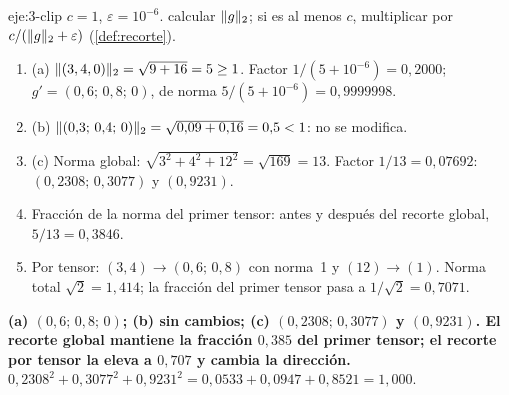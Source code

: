 \begin{solucion}{eje:3-clip}
\datos $c=1$, $\varepsilon=10^{-6}$.
\planteamiento calcular $\lVert g\rVert_2$; si es al menos $c$, multiplicar por $c/(\lVert g\rVert_2+\varepsilon)$ (\cref{def:recorte}).
\pasos
\begin{enumerate}[label=\arabic*.]
  \item (a) $\lVert(3,4,0)\rVert_2=\sqrt{9+16}=5\ge 1$. Factor $1/(5+10^{-6})=0{,}2000$; $g'=(0{,}6;\allowbreak\,0{,}8;\allowbreak\,0)$, de norma $5/(5+10^{-6})=0{,}9999998$.
  \item (b) $\lVert(0{,}3;\allowbreak\,0{,}4;\allowbreak\,0)\rVert_2=\sqrt{0{,}09+0{,}16}=0{,}5<1$: no se modifica.
  \item (c) Norma global: $\sqrt{3^{2}+4^{2}+12^{2}}=\sqrt{169}=13$. Factor $1/13=0{,}07692$: $(0{,}2308;\allowbreak\,0{,}3077)$ y $(0{,}9231)$.
  \item Fracción de la norma del primer tensor: antes y después del recorte global, $5/13=0{,}3846$.
  \item Por tensor: $(3,4)\to(0{,}6;\allowbreak\,0{,}8)$ con norma~1 y $(12)\to(1)$. Norma total $\sqrt 2=1{,}414$; la fracción del primer tensor pasa a $1/\sqrt2=0{,}7071$.
\end{enumerate}
\resultado \textbf{(a) $(0{,}6;\allowbreak\,0{,}8;\allowbreak\,0)$; (b) sin cambios; (c) $(0{,}2308;\allowbreak\,0{,}3077)$ y $(0{,}9231)$. El recorte global mantiene la fracción $0{,}385$ del primer tensor; el recorte por tensor la eleva a $0{,}707$ y cambia la dirección.}
\comprobacion $0{,}2308^{2}+0{,}3077^{2}+0{,}9231^{2}=0{,}0533+0{,}0947+0{,}8521=1{,}000$.
\end{solucion}

